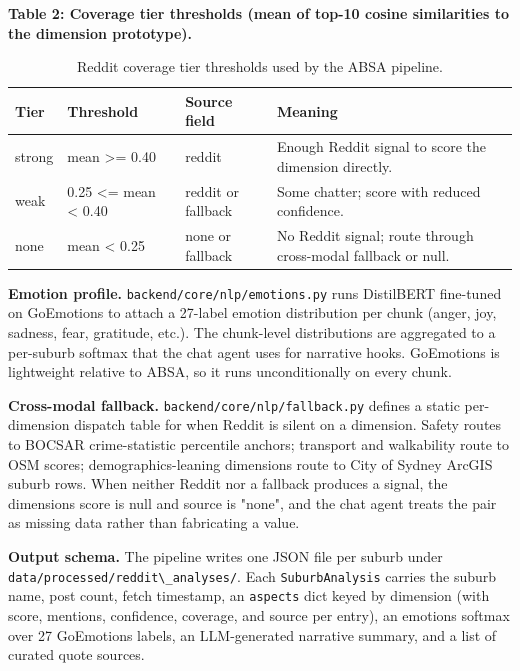 \documentclass[11pt,a4paper]{article}
\newcounter{none}
\newcommand{\passthrough}[1]{#1}
\begin{document}
\textbf{Table 2: Coverage tier thresholds (mean of top-10 cosine similarities to the dimension prototype).}

\begin{table}[H]
\centering
\caption{Reddit coverage tier thresholds used by the ABSA pipeline.}
\label{tab:coverage-tiers}
\begin{tabular}{|L{0.15\textwidth}|L{0.20\textwidth}|L{0.18\textwidth}|L{0.37\textwidth}|}
\hline
\textbf{Tier} & \textbf{Threshold} & \textbf{Source field} & \textbf{Meaning} \\
\hline
strong & mean \textgreater= 0.40 & reddit & Enough Reddit signal to score the dimension directly. \\
\hline
weak & 0.25 \textless= mean \textless{} 0.40 & reddit or fallback & Some chatter; score with reduced confidence. \\
\hline
none & mean \textless{} 0.25 & none or fallback & No Reddit signal; route through cross-modal fallback or null. \\
\hline
\end{tabular}
\end{table}

\textbf{Emotion profile.} \passthrough{\lstinline!backend/core/nlp/emotions.py!} runs DistilBERT fine-tuned on GoEmotions to attach a 27-label emotion distribution per chunk (anger, joy, sadness, fear, gratitude, etc.). The chunk-level distributions are aggregated to a per-suburb softmax that the chat agent uses for narrative hooks. GoEmotions is lightweight relative to ABSA, so it runs unconditionally on every chunk.

\textbf{Cross-modal fallback.} \passthrough{\lstinline!backend/core/nlp/fallback.py!} defines a static per-dimension dispatch table for when Reddit is silent on a dimension. Safety routes to BOCSAR crime-statistic percentile anchors; transport and walkability route to OSM scores; demographics-leaning dimensions route to City of Sydney ArcGIS suburb rows. When neither Reddit nor a fallback produces a signal, the dimension\textquotesingle s score is null and source is "none", and the chat agent treats the pair as missing data rather than fabricating a value.

\textbf{Output schema.} The pipeline writes one JSON file per suburb under \passthrough{\lstinline!data/processed/reddit\_analyses/!}. Each \passthrough{\lstinline!SuburbAnalysis!} carries the suburb name, post count, fetch timestamp, an \passthrough{\lstinline!aspects!} dict keyed by dimension (with score, mentions, confidence, coverage, and source per entry), an emotions softmax over 27 GoEmotions labels, an LLM-generated narrative summary, and a list of curated quote sources.
\end{document}
